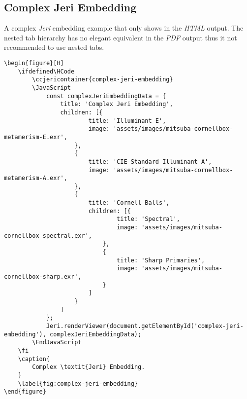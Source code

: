 \subsection*{Complex Jeri Embedding}

A complex \textit{Jeri} embedding example that only shows in the \textit{HTML}
output. The nested tab hierarchy has no elegant equivalent in the \textit{PDF}
output thus it not recommended to use nested tabs.

\begin{lstlisting}[caption={Complex \textit{Jeri} Embedding.}]
\begin{figure}[H]
    \ifdefined\HCode
        \ccjericontainer{complex-jeri-embedding}
        \JavaScript
            const complexJeriEmbeddingData = {
                title: 'Complex Jeri Embedding',
                children: [{
                        title: 'Illuminant E',
                        image: 'assets/images/mitsuba-cornellbox-metamerism-E.exr',
                    },
                    {
                        title: 'CIE Standard Illuminant A',
                        image: 'assets/images/mitsuba-cornellbox-metamerism-A.exr',
                    },
                    {
                        title: 'Cornell Balls',
                        children: [{
                                title: 'Spectral',
                                image: 'assets/images/mitsuba-cornellbox-spectral.exr',
                            },
                            {
                                title: 'Sharp Primaries',
                                image: 'assets/images/mitsuba-cornellbox-sharp.exr',
                            }
                        ]
                    }
                ]
            };
            Jeri.renderViewer(document.getElementById('complex-jeri-embedding'), complexJeriEmbeddingData);
        \EndJavaScript
    \fi
    \caption{
        Complex \textit{Jeri} Embedding.
    }
    \label{fig:complex-jeri-embedding}
\end{figure}
\end{lstlisting}

